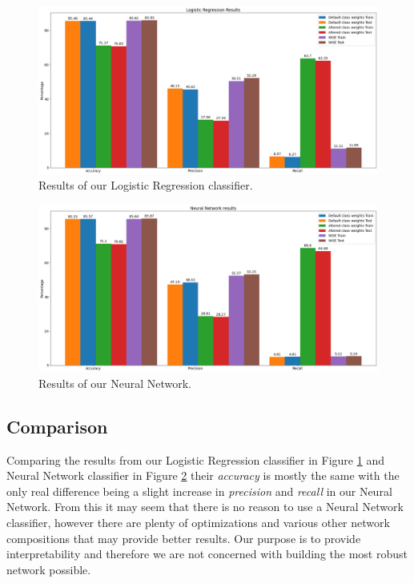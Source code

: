 \begin {figure}[!htpb]
\centering
  \includegraphics[width=\linewidth]{Credit_Images/Results_Logistic.png}
   \caption{Results of our Logistic Regression classifier.}
    \label{fig-log-results}
\end{figure}
\begin {figure}[!htpb]
\centering
  \includegraphics[width=\linewidth]{Credit_Images/NN_res.png}
   \caption{Results of our Neural Network.}
    \label{fig-nn-results}
\end{figure}

\subsection{Comparison}
Comparing the results from our Logistic Regression classifier in Figure \ref{fig-log-results} and Neural Network classifier in Figure \ref{fig-nn-results} their \emph{accuracy} is mostly the same with the only real difference being a slight increase in \emph{precision} and \emph{recall} in our Neural Network. From this it may seem that there is no reason to use a Neural Network classifier, however there are plenty of optimizations and various other network compositions that may provide better results. Our purpose is to provide interpretability and therefore we are not concerned with building the most robust network possible.

